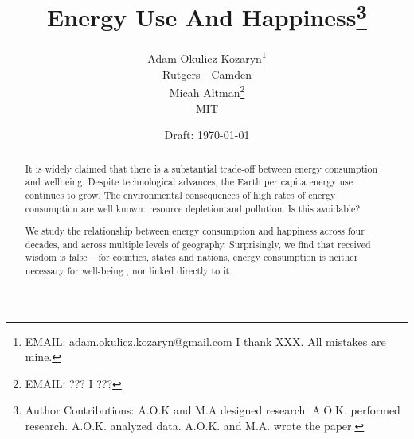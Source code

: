 \documentclass[10pt, letterpaper]{article}
\date{Draft: {}\today}
\title{
Energy Use And Happiness\footnote{Author Contributions: A.O.K and M.A designed
  research. A.O.K. performed research. A.O.K. analyzed data. A.O.K. and
  M.A. wrote the paper.  %
}
}
\author{
Adam Okulicz-Kozaryn\thanks{EMAIL: adam.okulicz.kozaryn@gmail.com
  \hfill I thank XXX.  All mistakes are mine.} \\
{\small Rutgers - Camden}\\
Micah Altman\thanks{EMAIL: ???
  \hfill I ???} \\
{\small MIT}
}
\begin{document}


\maketitle
\vspace{-.4in}
\begin{center}

\end{center}

\begin{abstract}
\noindent  

%

It is widely claimed that there is a substantial trade-off between energy consumption and wellbeing. 
Despite technological advances, the Earth per capita energy use continues to grow.
The environmental consequences of high rates of energy consumption are well known:
resource depletion and pollution. Is this avoidable?

We study the relationship between energy consumption and happiness across four decades, and across multiple levels of geography.  Surprisingly, we find that received wisdom is false -- for counties, states and nations, energy consumption is neither necessary for well-being , nor linked directly to it. 




\end{abstract}


\vspace{.15in} 
\end{document}
